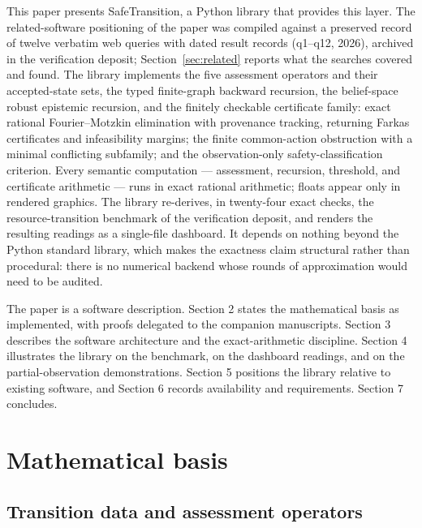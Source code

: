 \documentclass[3p,11pt]{elsarticle}
\begin{document}
This paper presents SafeTransition, a Python library that provides this
layer. The related-software positioning of the paper was compiled against a
preserved record of twelve verbatim web queries with dated result records
(q1--q12, 2026), archived in the verification deposit; Section~\ref{sec:related}
reports what the searches covered and found. The library implements the five assessment operators and their
accepted-state sets, the typed finite-graph backward recursion, the
belief-space robust epistemic recursion, and the finitely checkable
certificate family: exact rational Fourier--Motzkin elimination with
provenance tracking, returning Farkas certificates and infeasibility
margins; the finite common-action obstruction with a minimal conflicting
subfamily; and the observation-only safety-classification criterion. Every semantic computation --- assessment, recursion, threshold, and certificate arithmetic --- runs in
exact rational arithmetic; floats appear only in rendered graphics. The
library re-derives, in twenty-four exact checks, the resource-transition
benchmark of the verification deposit, and renders the resulting readings as
a single-file dashboard. It depends on nothing beyond the Python standard
library, which makes the exactness claim structural rather than procedural:
there is no numerical backend whose rounds of approximation would need to be
audited.

The paper is a software description. Section 2 states the mathematical basis
as implemented, with proofs delegated to the companion manuscripts.
Section 3 describes the software architecture and the exact-arithmetic
discipline. Section 4 illustrates the library on the benchmark, on the
dashboard readings, and on the partial-observation demonstrations. Section 5
positions the library relative to existing software, and Section 6 records
availability and requirements. Section 7 concludes.

\section{Mathematical basis}\label{sec:math}

\subsection{Transition data and assessment operators}\label{sec:operators}
\end{document}
